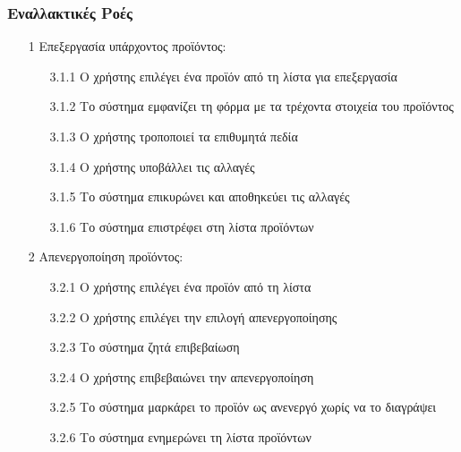 \documentclass[12pt,a4paper,twoside]{book}
\begin{document}
\subsubsection{Εναλλακτικές Ροές}
\begin{enumerate}
  \item[1 ] Επεξεργασία υπάρχοντος προϊόντος:
        \begin{enumerate}
          \item[3.1.1 ] Ο χρήστης επιλέγει ένα προϊόν από τη λίστα για επεξεργασία
          \item[3.1.2 ] Το σύστημα εμφανίζει τη φόρμα με τα τρέχοντα στοιχεία του προϊόντος
          \item[3.1.3 ] Ο χρήστης τροποποιεί τα επιθυμητά πεδία %
          \item[3.1.4 ] Ο χρήστης υποβάλλει τις αλλαγές
          \item[3.1.5 ] Το σύστημα επικυρώνει και αποθηκεύει τις αλλαγές
          \item[3.1.6 ] Το σύστημα επιστρέφει στη λίστα προϊόντων
        \end{enumerate}
  \item[2 ] Απενεργοποίηση προϊόντος:
        \begin{enumerate}
          \item [3.2.1 ] Ο χρήστης επιλέγει ένα προϊόν από τη λίστα
          \item [3.2.2 ] Ο χρήστης επιλέγει την επιλογή απενεργοποίησης
          \item [3.2.3 ] Το σύστημα ζητά επιβεβαίωση
          \item [3.2.4 ] Ο χρήστης επιβεβαιώνει την απενεργοποίηση
          \item [3.2.5 ] Το σύστημα μαρκάρει το προϊόν ως ανενεργό χωρίς να το διαγράψει %
          \item [3.2.6 ] Το σύστημα ενημερώνει τη λίστα προϊόντων
        \end{enumerate}

\end{enumerate}
\end{document}

